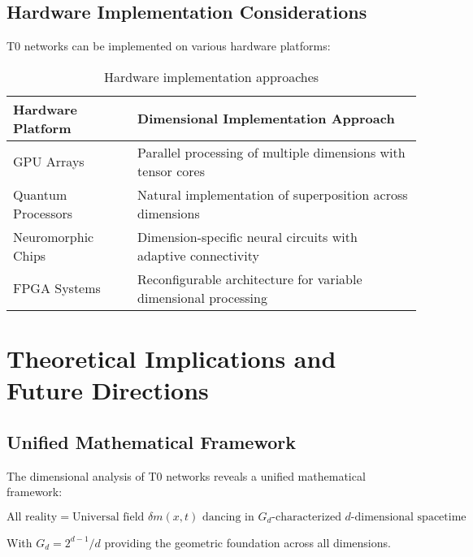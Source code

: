 \documentclass[12pt,a4paper]{article}
\newcommand{\deltafield}{\ensuremath{\delta m}}
\begin{document}
	\subsection{Hardware Implementation Considerations}
	\label{subsec:hardware_implementation}
	
	T0 networks can be implemented on various hardware platforms:
	
	\begin{table}[htbp]
		\centering
		\begin{tabular}{lp{8cm}}
			\toprule
			\textbf{Hardware Platform} & \textbf{Dimensional Implementation Approach} \\
			\midrule
			GPU Arrays & Parallel processing of multiple dimensions with tensor cores \\
			Quantum Processors & Natural implementation of superposition across dimensions \\
			Neuromorphic Chips & Dimension-specific neural circuits with adaptive connectivity \\
			FPGA Systems & Reconfigurable architecture for variable dimensional processing \\
			\bottomrule
		\end{tabular}
		\caption{Hardware implementation approaches}
		\label{tab:hardware_approaches}
	\end{table}
	
	\section{Theoretical Implications and Future Directions}
	\label{sec:theoretical_implications}
	
	\subsection{Unified Mathematical Framework}
	\label{subsec:unified_framework}
	
	The dimensional analysis of T0 networks reveals a unified mathematical framework:
	
	\begin{tcolorbox}[colback=green!5!white,colframe=green!75!black,title=Unified T0 Mathematical Framework]
		\begin{equation}
			\boxed{\text{All reality} = \text{Universal field } \deltafield(x,t) \text{ dancing in } G_d\text{-characterized }d\text{-dimensional spacetime}}
		\end{equation}
		
		With $G_d = 2^{d-1}/d$ providing the geometric foundation across all dimensions.
	\end{tcolorbox}
	
\end{document}
